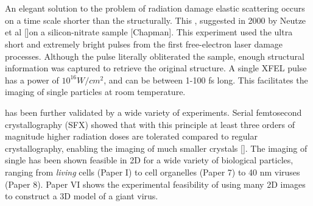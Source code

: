 \section{\DIFdelbegin {}\DIFdelend \DIFaddbegin {}\DIFaddend }
An elegant solution to the problem of radiation damage \DIFdelbegin {}\DIFdelend \DIFaddbegin {}\DIFaddend elastic scattering occurs on a time scale \DIFaddbegin {}\DIFaddend shorter than
the \DIFdelbegin {}\DIFdelend \DIFaddbegin {}\DIFaddend structurally. This
\DIFdelbegin {}\DIFdelend \DIFaddbegin {}\DIFaddend , suggested in 2000 by
Neutze et al []\DIFdelbegin {}\DIFdelend \DIFaddbegin {}\DIFaddend on a silicon-nitrate sample [Chapman]. This experiment used the ultra
short and extremely bright pulses from the first \DIFdelbegin {}\DIFdelend \DIFaddbegin {}\DIFaddend free-electron
laser \DIFdelbegin {}\DIFdelend \DIFaddbegin {}\DIFaddend damage processes. Although the pulse
literally obliterated the sample, enough structural information was
captured to retrieve the original structure. A single XFEL pulse has a
power \DIFdelbegin {}\DIFdelend \DIFaddbegin {}\DIFaddend of $10^16 W/cm^2$, and can be between 1-100 fs
long. This facilitates the imaging of single particles at room
temperature.

\DIFdelbegin {}\DIFdelend \DIFaddbegin {}\DIFaddend has been further validated by a wide
variety of experiments. Serial femtosecond crystallography (SFX)
showed that with this principle at least three orders of magnitude
higher radiation doses are tolerated compared to regular
crystallography, enabling the imaging of much smaller crystals []. The
imaging of single \DIFdelbegin {}\DIFdelend \DIFaddbegin {}\DIFaddend has been shown feasible in 2D for a wide
variety of biological particles, ranging from \textit{living} cells
(Paper I) to cell organelles (Paper 7) to 40 nm viruses (Paper
8). Paper VI shows the experimental feasibility of using many 2D
images to construct a 3D model of a giant virus.

